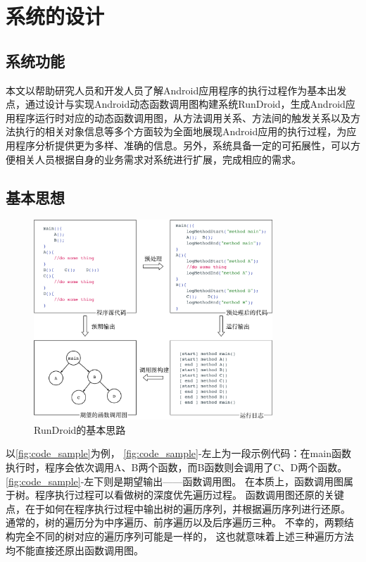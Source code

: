 \chapter{系统的设计}
\label{chp:design}


\section{系统功能}
本文以帮助研究人员和开发人员了解Android应用程序的执行过程作为基本出发点，通过设计与实现Android动态函数调用图构建系统RunDroid，生成Android应用程序运行时对应的动态函数调用图，从方法调用关系、方法间的触发关系以及方法执行的相关对象信息等多个方面较为全面地展现Android应用的执行过程，为应用程序分析提供更为多样、准确的信息。另外，系统具备一定的可拓展性，可以方便相关人员根据自身的业务需求对系统进行扩展，完成相应的需求。

\section{基本思想}



\begin{figure}[!ht]
	\centering
	\includegraphics[width=0.8\textwidth]{./Figures/code-sample.png}
	\caption{RunDroid的基本思路}
	\label{fig:code_sample}
\end{figure}


以\autoref{fig:code_sample}为例，%
\autoref{fig:code_sample}-左上为一段示例代码：在main函数执行时，程序会依次调用A、B两个函数，而B函数则会调用了C、D两个函数。
\autoref{fig:code_sample}-左下则是期望输出——函数调用图。
在本质上，函数调用图属于树。程序执行过程可以看做树的深度优先遍历过程。
函数调用图还原的关键点，在于如何在程序执行过程中输出树的遍历序列，并根据遍历序列进行还原。
通常的，树的遍历分为中序遍历、前序遍历以及后序遍历三种。
不幸的，两颗结构完全不同的树对应的遍历序列可能是一样的，
这也就意味着上述三种遍历方法均不能直接还原出函数调用图。

